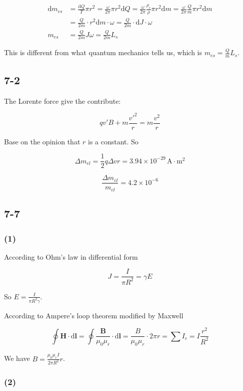 \documentclass[a4paper,11pt]{amsart}
\theoremstyle{definition}
\begin{document}
	\begin{align}
		\mathrm{d}m_{es}&=\frac{\mathrm{d}Q}{T}\pi r^2=\frac{\omega}{2\pi}\pi r^2\mathrm{d}Q=\frac{\omega}{2\pi}\frac{\rho _e}{\rho}\pi r^2\mathrm{d}m=\frac{\omega}{2\pi}\frac{Q}{m}\pi r^2\mathrm{d}m
		\\
		&=\frac{Q}{2m}\cdot r^2\mathrm{d}m\cdot \omega =\frac{Q}{2m}\cdot \mathrm{d}J\cdot \omega 
		\\
		m_{es}&=\frac{Q}{2m}J\omega =\frac{Q}{2m}L_s
	\end{align}
	
	This is different from what quantum mechanics tells us, which is $\displaystyle m_{es}=\frac{Q}{m}L_s$.
	
	\subsection*{7-2}
	
	The Lorente force give the contribute:
	
	$$
	qv'B+m\frac{v'^2}{r}=m\dfrac{v^2}{r}
	$$
	
	Base on the opinion that $r$ is a constant. So
	
	$$
	\Delta m_{el}=\dfrac{1}{2}q\Delta vr=3.94\times10^{-29}\,\mathrm{A\cdot m^2}
	$$
	
	$$
	\dfrac{\Delta m_{el}}{m_{el}}=4.2\times10^{-6}
	$$
	
	\subsection*{7-7}
	
	\subsubsection*{(1)}
	
	According to Ohm's law in differential form
	
	$$
	J=\frac{I}{\pi R^2}=\gamma E
	$$
	
	So $\displaystyle E=\frac{I}{\pi R^2\gamma}.$
	
	According to Ampere's loop theorem modified by Maxwell
	
	$$
	\oint{\boldsymbol{H}\cdot \mathrm{d}\boldsymbol{l}}=\oint{\frac{\boldsymbol{B}}{\mu _0\mu _r}\cdot \mathrm{d}\boldsymbol{l}=\frac{B}{\mu _0\mu _r}\cdot 2\pi r=\sum{I_c=I\frac{r^2}{R^2}}}
	$$
	
	We have $\displaystyle B=\frac{\mu _0\mu _rI}{2\pi R^2}r$.
	
	
	\subsubsection*{(2)}
		
\end{document}
